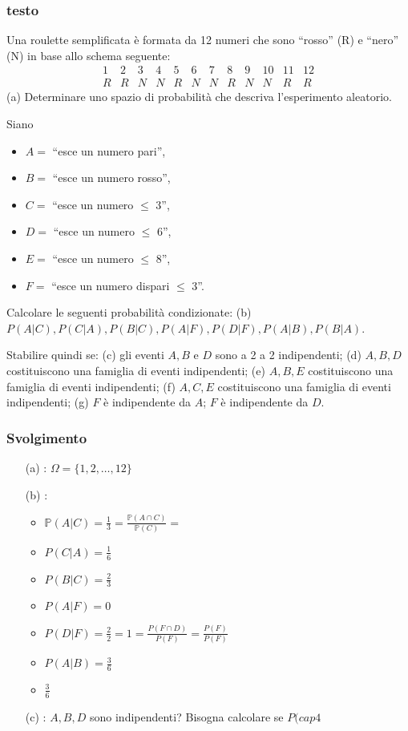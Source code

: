 \subsubsection{testo}
Una roulette semplificata è formata da 12 numeri che sono “rosso” (R) e “nero” (N) in base allo schema seguente:
\[
\begin{array}{cccccccccccc}
1 & 2 & 3 & 4 & 5 & 6 & 7 & 8 & 9 & 10 & 11 & 12 \\
R & R & N & N & R & N & N & R & N & N & R & R
\end{array}
\]
(a) Determinare uno spazio di probabilità che descriva l’esperimento aleatorio.

Siano
\begin{itemize}
    \item \( A = \) “esce un numero pari”,
    \item \( B = \) “esce un numero rosso”,
    \item \( C = \) “esce un numero $\leq$ 3”,
    \item \( D = \) “esce un numero $\leq$ 6”,
    \item \( E = \) “esce un numero $\leq$ 8”,
    \item \( F = \) “esce un numero dispari $\leq$ 3”.
\end{itemize}

Calcolare le seguenti probabilità condizionate:
(b) \( P(A|C), P(C|A), P(B|C), P(A|F), P(D|F), P(A|B), P(B|A) \).

Stabilire quindi se:
(c) gli eventi \( A, B \) e \( D \) sono a 2 a 2 indipendenti;
(d) \( A, B, D \) costituiscono una famiglia di eventi indipendenti;
(e) \( A, B, E \) costituiscono una famiglia di eventi indipendenti;
(f) \( A, C, E \) costituiscono una famiglia di eventi indipendenti;
(g) \( F \) è indipendente da \( A \); \( F \) è indipendente da \( D \).

\subsubsection{Svolgimento}
\begin{itemize}
  \item[(a)]: $\Omega =\{1,2,\dots, 12\}$
  \item[(b)]: 
  \begin{itemize}
    \item $\mathbb{P}(A|C) = \frac{1}{3}=\frac{\mathbb{P}(A\cap C)}{\mathbb{P}(C)}=$ 
    \item $P(C|A)= \frac{1}{6}$
    \item $P(B|C) = \frac{2}{3}$
    \item $P(A|F) = 0$
    \item $P(D|F) = \frac{2}{2}=1=\frac{P(F\cap D)}{P(F)} = \frac{P(F)}{P(F)}$
    \item $P(A|B) = \frac{3}{6}$
    \item $\frac{3}{6}$
  \end{itemize}
  
  \item[(c)]: $A,B,D$ sono indipendenti? Bisogna calcolare se $P(cap4$ 
\end{itemize}
